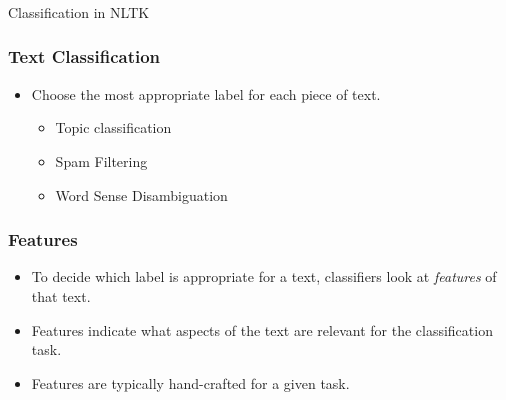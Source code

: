 \begin{frame}[fragile]\frametitle{}

\begin{center}
{\Large Classification in NLTK}
\end{center}
\end{frame}

\begin{frame}[fragile]\frametitle{Text Classification}
  \begin{itemize}
    \item Choose the most appropriate label for each piece of text.
    \begin{itemize}
      \item Topic classification
      \item Spam Filtering
      \item Word Sense Disambiguation
    \end{itemize}
  \end{itemize}
\end{frame}

\begin{frame}[fragile]\frametitle{Features}
  \begin{itemize}
    \item To decide which label is appropriate for a text, 
      classifiers look at \emph{features} of that text.
    \item Features indicate what aspects of the text are
      relevant for the classification task.
    \item Features are typically hand-crafted for a given task.
  \end{itemize}
\end{frame}

